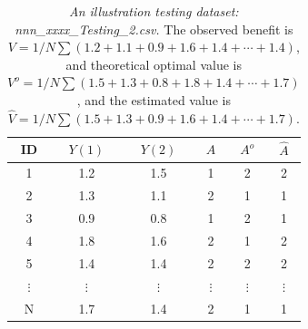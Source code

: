 \documentclass[12pt]{article}
\def\hat{\widehat}
\begin{document}
\begin{table}[htbp]
	\centering
	\caption{\emph{An illustration testing dataset: nnn\_xxxx\_Testing\_2.csv.} The observed benefit is $V=1/N \sum (1.2+1.1+0.9+1.6+1.4+\cdots+1.4)$, and theoretical optimal value is $V^o=1/N \sum (1.5+1.3+0.8+1.8+1.4+\cdots+1.7)$, and the estimated value is $\hat{V}=1/N \sum (1.5+1.3+0.9+1.6+1.4+\cdots+1.7)$.}
	\begin{tabular}{c|cc|ccc}
		\hline
		\hline
		ID &  $Y(1)$    & $Y(2)$    & $A$ & $A^o$ & $\hat{A} $  \\
		\hline
		1& 1.2    & 1.5    &   1& 2 &2 \\
		2& 1.3    & 1.1    &  2 & 1 &1\\
		3& 0.9    & 0.8    &    1 & 2 &1 \\
		4& 1.8    & 1.6    &   2 & 1 &2 \\
		5& 1.4    & 1.4    &  2 & 2 &2 \\
		$\vdots$ &  $\vdots$   & $\vdots$     & $\vdots$     & $\vdots$ &  $\vdots$    \\
		N & 1.7    & 1.4    &   2 & 1 &1\\
		\hline
		\hline
	\end{tabular}%
	\label{tab:TestingDataExample2}%
\end{table}
\end{document}
